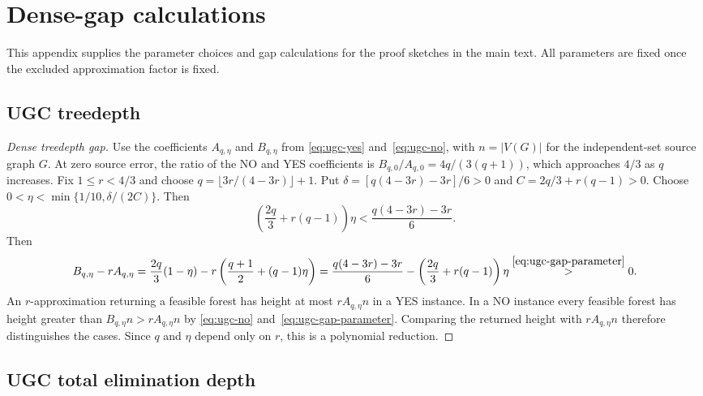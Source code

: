\section{Dense-gap calculations}
\label{app:dense-gap-calculations}

This appendix supplies the parameter choices and gap calculations
for the proof sketches in the main text. All parameters are fixed
once the excluded approximation factor is fixed.

\subsection{UGC treedepth}
\label{app:dense-ugc-td}

\begin{proof}[Dense treedepth gap]
Use the coefficients $A_{q,\eta}$ and $B_{q,\eta}$ from
\eqref{eq:ugc-yes} and~\eqref{eq:ugc-no}, with $n=|V(G)|$ for
the independent-set source graph $G$.
At zero source error, the ratio of the NO and YES coefficients is
$B_{q,0}/A_{q,0}=4q/(3(q+1))$, which approaches $4/3$ as $q$
increases. Fix $1\leq r<4/3$ and choose
$q=\lfloor3r/(4-3r)\rfloor+1$. Put
$\delta=[q(4-3r)-3r]/6>0$ and
$C=2q/3+r(q-1)>0$. Choose
$0<\eta<\min\{1/10,\delta/(2C)\}$. Then
\begin{equation}\label{eq:ugc-gap-parameter}
 \left(\frac{2q}{3}+r(q-1)\right)\eta
 <\frac{q(4-3r)-3r}{6}.
\end{equation}
Then
\[
B_{q,\eta}-rA_{q,\eta}
 =\frac{2q}{3}(1-\eta)
   -r\left(\frac{q+1}{2}+(q-1)\eta\right)
  =\frac{q(4-3r)-3r}{6}
   -\left(\frac{2q}{3}+r(q-1)\right)\eta
   \overset{\eqref{eq:ugc-gap-parameter}}{>}0.
\]
An $r$-approximation returning a feasible forest has height at most
$rA_{q,\eta}n$ in a YES instance. In a NO instance every feasible
forest has height greater than $B_{q,\eta}n>rA_{q,\eta}n$ by
\eqref{eq:ugc-no} and~\eqref{eq:ugc-gap-parameter}. Comparing the
returned height with $rA_{q,\eta}n$ therefore distinguishes the cases.
Since $q$ and $\eta$ depend only
on $r$, this is a polynomial reduction.
\end{proof}

\subsection{UGC total elimination depth}
\label{app:dense-ugc-total}

